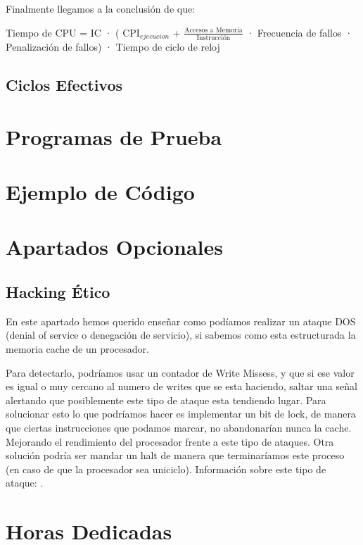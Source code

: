 \documentclass{article}
\begin{document}
Finalmente llegamos a la conclusión de que:

\begin{adjustwidth}{2cm}{2cm}
\vspace{15pt}
  Tiempo de CPU = IC · ( CPI$_{ejecucion}$ + $\frac{\text{Accesos a Memoria}}{\text{Instrucción}}$ · Frecuencia de fallos · Penalización de fallos) · Tiempo de ciclo de reloj
\vspace{15pt}
\end{adjustwidth}

\subsection{Ciclos Efectivos}
\lipsum[9-10]

\section{Programas de Prueba}
\lipsum[10-12]

\section{Ejemplo de Código}
\lipsum[13-14]

\section{Apartados Opcionales}
\subsection{Hacking Ético}
En este apartado hemos querido enseñar como podíamos realizar un ataque DOS (denial of service o denegación de servicio), si sabemos como esta estructurada la memoria cache de un procesador.\par
Para detectarlo, podríamos usar un contador de Write Missess, y que si ese valor es igual o muy cercano al numero de writes que se esta haciendo, saltar una señal alertando que posiblemente este tipo de ataque esta tendiendo lugar. 
Para solucionar esto lo que podríamos hacer es implementar un bit de lock, de manera que ciertas instrucciones que podamos marcar, no abandonarían nunca la cache. Mejorando el rendimiento del procesador frente a este tipo de ataques. Otra solución podría ser mandar un 
halt de manera que terminaríamos este proceso (en caso de que la procesador sea uniciclo). 
Información sobre este tipo de ataque: \cite{BackCache}.

\section{Horas Dedicadas}
\end{document}
